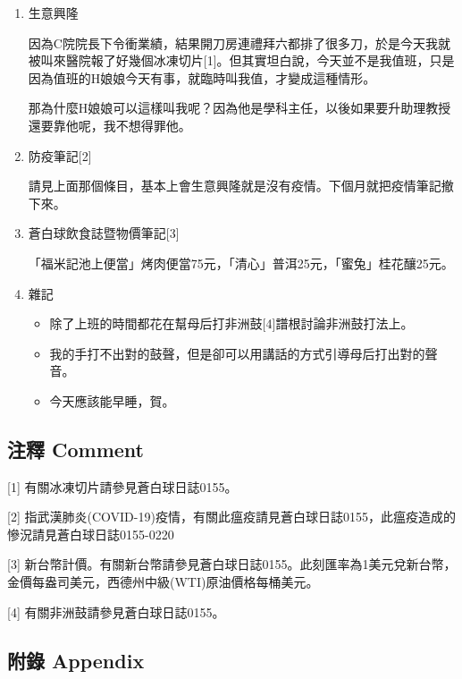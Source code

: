 \documentclass[a5paper, 12pt
]{book}
\providecommand{\tightlist}{%
  \setlength{\itemsep}{0pt}\setlength{\parskip}{0pt}}
\begin{document}
\begin{enumerate}
\def\labelenumi{\arabic{enumi}.}
\item
  生意興隆

  因為C院院長下令衝業績，結果開刀房連禮拜六都排了很多刀，於是今天我就被叫來醫院報了好幾個冰凍切片{[}1{]}。但其實坦白說，今天並不是我值班，只是因為值班的H娘娘今天有事，就臨時叫我值，才變成這種情形。

  那為什麼H娘娘可以這樣叫我呢？因為他是學科主任，以後如果要升助理教授還要靠他呢，我不想得罪他。
\item
  防疫筆記{[}2{]}

  請見上面那個條目，基本上會生意興隆就是沒有疫情。下個月就把疫情筆記撤下來。
\item
  蒼白球飲食誌暨物價筆記{[}3{]}

  「福米記池上便當」烤肉便當75元，「清心」普洱25元，「蜜兔」桂花釀25元。
\item
  雜記

  \begin{itemize}
  \tightlist
  \item
    除了上班的時間都花在幫母后打非洲鼓{[}4{]}譜根討論非洲鼓打法上。
  \item
    我的手打不出對的鼓聲，但是卻可以用講話的方式引導母后打出對的聲音。
  \item
    今天應該能早睡，賀。
  \end{itemize}
\end{enumerate}

\hypertarget{ux6ce8ux91cb-comment-90}{%
\subsection{注釋 Comment}\label{ux6ce8ux91cb-comment-90}}

{[}1{]} 有關冰凍切片請參見蒼白球日誌0155。

{[}2{]}
指武漢肺炎(COVID-19)疫情，有關此瘟疫請見蒼白球日誌0155，此瘟疫造成的慘況請見蒼白球日誌0155-0220

{[}3{]}
新台幣計價。有關新台幣請參見蒼白球日誌0155。此刻匯率為1美元兌新台幣，金價每盎司美元，西德州中級(WTI)原油價格每桶美元。

{[}4{]} 有關非洲鼓請參見蒼白球日誌0155。

\hypertarget{ux9644ux9304-appendix-90}{%
\subsection{附錄 Appendix}\label{ux9644ux9304-appendix-90}}
\end{document}
